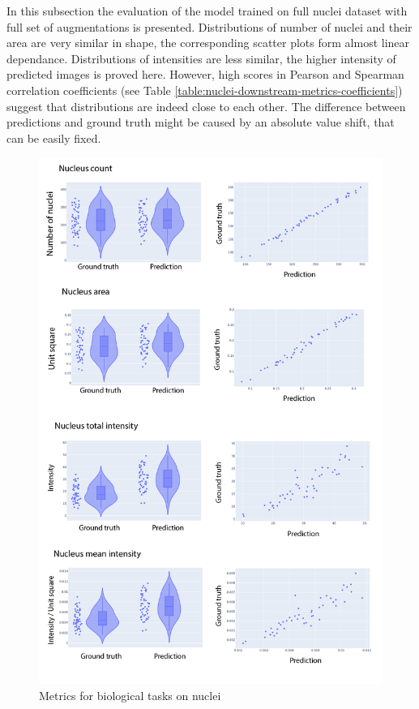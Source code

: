 In this subsection the evaluation of the model trained on full nuclei dataset with full set of augmentations is presented. Distributions of number of nuclei and their area are very similar in shape, the corresponding scatter plots form almost linear dependance. Distributions of intensities are less similar, the higher intensity of predicted images is proved here. However, high scores in Pearson and Spearman correlation coefficients (see Table \ref{table:nuclei-downstream-metrics-coefficients}) suggest that distributions are indeed close to each other. The difference between predictions and ground truth might be caused by an absolute value shift, that can be easily fixed.
\begin{figure}[htb]
	\begin{center}
		\includegraphics[width=\linewidth]{bilder/nuclei/metric/combined-metrics.png}
		\caption{Metrics for biological tasks on nuclei}\label{fig:nuclei-downstream-metrics}
	\end{center}
\end{figure}

